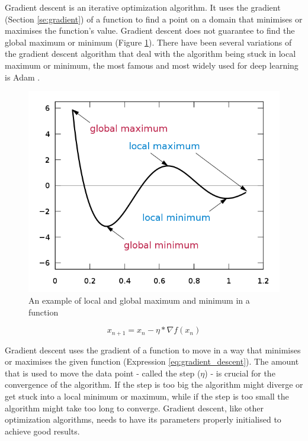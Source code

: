 \documentclass[times, utf8, diplomski]{fer}
\begin{document}
Gradient descent is an iterative optimization algorithm. It uses the gradient (Section \ref{se:gradient}) of a function to find a point on a domain that minimises or maximises the function's value. Gradient descent does not guarantee to find the global maximum or minimum (Figure \ref{fig:local_and_global_function_values}). There have been several variations of the gradient descent algorithm that deal with the algorithm being stuck in local maximum or minimum, the most famous and most widely used for deep learning is Adam \citep{kingma_adam:_2014}.

\begin{figure}
  \includegraphics[scale=0.5]{figures/local_global_maxima_minima.png}
  \centering
  \caption{An example of local and global maximum and minimum in a function}
  \label{fig:local_and_global_function_values}
\end{figure}

\begin{equation} 
\label{eq:gradient_descent}
    x_{n+1} = x_n - \eta * \nabla{f(x_n)}
\end{equation}

Gradient descent uses the gradient of a function to move in a way that minimises or maximises the given function (Expression \ref{eq:gradient_descent}). The amount that is used to move the data point - called the step ($\eta$) - is crucial for the convergence of the algorithm. If the step is too big the algorithm might diverge or get stuck into a local minimum or maximum, while if the step is too small the algorithm might take too long to converge. Gradient descent, like other optimization algorithms, needs to have its parameters properly initialised to achieve good results.
\end{document}
